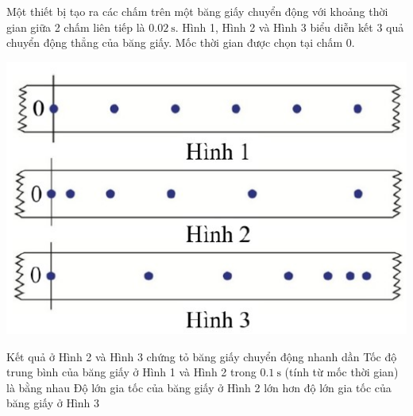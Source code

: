 \begin{ex}
	Một thiết bị tạo ra các chấm trên một băng giấy chuyển động với khoảng thời gian giữa 2 chấm liên tiếp là $\SI{0.02}{\second}$. Hình 1, Hình 2 và Hình 3 biểu diễn kết 3 quả chuyển động thẳng của băng giấy. Mốc thời gian được chọn tại chấm 0.
	\begin{center}
		\includegraphics[width=0.4\linewidth]{../figs/D10-2-9}
	\end{center}
	{Kết quả ở Hình 2 và Hình 3 chứng tỏ băng giấy chuyển động nhanh dần}
	{\True Tốc độ trung bình của băng giấy ở Hình 1 và Hình 2 trong $\SI{0.1}{\second}$ (tính từ mốc thời gian) là bằng nhau}
	{Độ lớn gia tốc của băng giấy ở Hình 2 lớn hơn độ lớn gia tốc của băng giấy ở Hình 3}
\end{ex}
